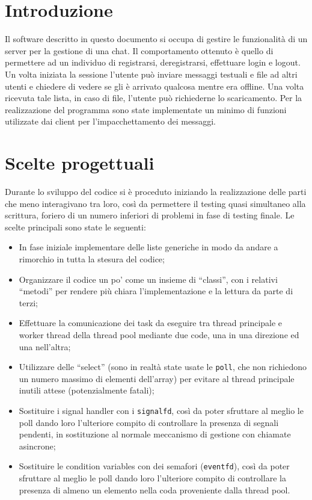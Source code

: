\documentclass[12pt,a4paper]{article}
\begin{document}

\tableofcontents
\newpage

							
\section{Introduzione}
Il software descritto in questo documento si occupa di gestire le funzionalità di un server per la gestione di una chat. Il comportamento ottenuto è quello di permettere ad un individuo di registrarsi, deregistrarsi, effettuare login e logout. Un volta iniziata la sessione l'utente può inviare messaggi testuali e file ad altri utenti e chiedere di vedere se gli è arrivato qualcosa mentre era offline. Una volta ricevuta tale lista, in caso di file, l'utente può richiederne lo scaricamento.
Per la realizzazione del programma sono state implementate un minimo di funzioni utilizzate dai client per l'impacchettamento dei messaggi.

							
\section{Scelte progettuali}
Durante lo sviluppo del codice si è proceduto iniziando la realizzazione delle parti che meno interagivano tra loro, così da permettere il testing quasi simultaneo alla scrittura, foriero di un numero inferiori di problemi in fase di testing finale.
Le scelte principali sono state le seguenti:
\begin{itemize}
\item In fase iniziale implementare delle liste generiche in modo da andare a rimorchio in tutta la stesura del codice;
\item Organizzare il codice un po' come un insieme di ``classi'', con i relativi ``metodi'' per rendere più chiara l'implementazione e la lettura da parte di terzi;
\item Effettuare la comunicazione dei task da eseguire tra thread principale e worker thread della thread pool mediante due code, una in una direzione ed una nell'altra;
\item Utilizzare delle ``select'' (sono in realtà state usate le \texttt{poll}, che non richiedono un numero massimo di elementi dell'array) per evitare al thread principale inutili attese (potenzialmente fatali);
\item Sostituire i signal handler con i \texttt{signalfd}, così da poter sfruttare al meglio le poll dando loro l'ulteriore compito di controllare la presenza di segnali pendenti, in sostituzione al normale meccanismo di gestione con chiamate asincrone;
\item Sostituire le condition variables con dei semafori (\texttt{eventfd}), così da poter sfruttare al meglio le poll dando loro l'ulteriore compito di controllare la presenza di almeno un elemento nella coda proveniente dalla thread pool.
\end{itemize}
\end{document}
